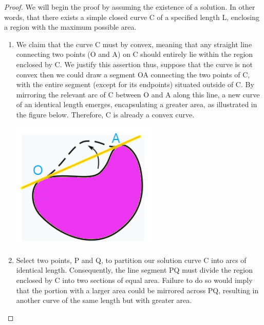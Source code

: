 \documentclass[a4paper]{book}
\begin{document}
\begin{proof}
    We will begin the proof by assuming the existence of a solution. In other words, that there exists a simple closed curve C of a specified length L, enclosing a region with the maximum possible area.
    \begin{enumerate}
        \item We claim that the curve C must by convex, meaning that any straight line connecting two points (O and A) on C should entirely lie within the region enclosed by C. We justify this assertion thus, suppose that the curve is not convex then we could draw a segment OA connecting the two points of C, with the entire segment (except for its endpoints) situated outside of C. By mirroring the relevant arc of C between O and A along this line, a new curve of an identical length emerges, encapsulating a greater area, as illustrated in the figure below. Therefore, C is already a convex curve.

        \begin{minipage}{\linewidth}
            \centering
            \includegraphics[width=70mm]{isofig1.png}
        \end{minipage}
        \item Select two points, P and Q, to partition our solution curve C into arcs of identical length. Consequently, the line segment PQ must divide the region enclosed by C into two sections of equal area. Failure to do so would imply that the portion with a larger area could be mirrored across PQ, resulting in another curve of the same length but with greater area.


\end{enumerate}
\end{proof}
\end{document}
